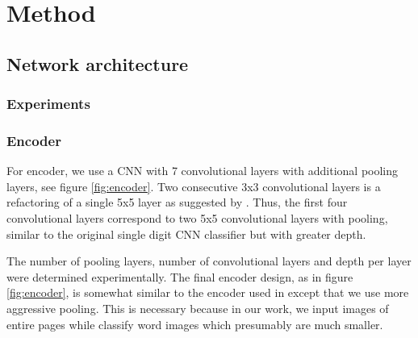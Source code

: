 \section{Method}

\subsection{Network architecture}

\subsubsection{Experiments}

\subsubsection{Encoder}



For encoder, we use a CNN with 7 convolutional layers with additional pooling layers, see figure \ref{fig:encoder}.
Two consecutive 3x3 convolutional layers is a refactoring of a single 5x5 layer as suggested by \cite{InceptionV3}. Thus, the first four convolutional layers correspond to two 5x5 convolutional layers with pooling, similar to the original single digit CNN classifier \cite{lecun_1989} but with greater depth.

The number of pooling layers, number of convolutional layers and depth per layer were determined experimentally. The final encoder design, as in figure \ref{fig:encoder}, is somewhat similar to the encoder used in \cite{FornesCnnCategorization} except that we use more aggressive pooling. This is necessary because in our work, we input images of entire pages while \cite{FornesCnnCategorization} classify word images which presumably are much smaller.






